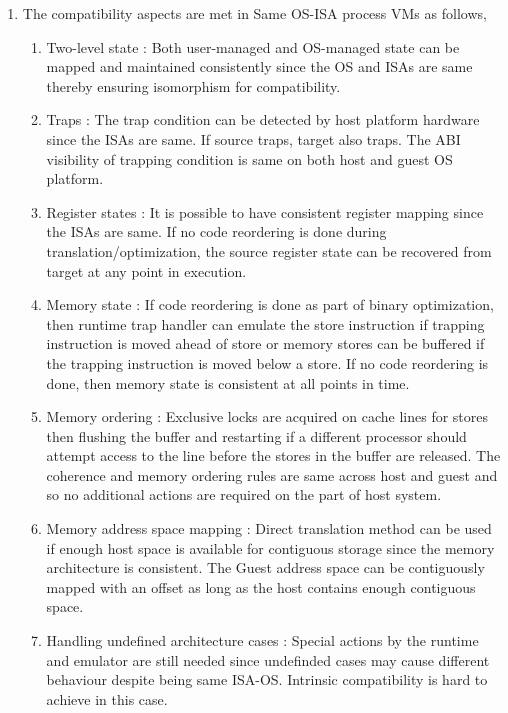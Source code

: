 \documentclass[11pt,a4paper,oneside]{article}
\begin{document}
\begin{enumerate}
		\item The compatibility aspects are met in Same OS-ISA process VMs as follows,
			\begin{enumerate}
				\item Two-level state : Both user-managed and OS-managed state can be mapped and maintained consistently since the OS and ISAs are same thereby ensuring isomorphism for compatibility.
				\item Traps : The trap condition can be detected by host platform hardware since the ISAs are same. If source traps, target also traps. The ABI visibility of trapping condition is same on both host and guest OS platform. 
				\item Register states : It is possible to have consistent register mapping since the ISAs are same. If no code reordering is done during translation/optimization, the source register state can be recovered from target at any point in execution.
				\item Memory state : If code reordering is done as part of binary optimization, then runtime trap handler can emulate the store instruction if trapping instruction is moved ahead of  store or memory stores can be buffered if the trapping instruction is moved  below a store. If no code reordering is done, then memory state is consistent at all points in time.
				\item Memory ordering : Exclusive locks are acquired on cache lines for stores 
			 then flushing the buffer and restarting if a different processor
				should attempt access to the line before the stores in the buffer are released. The coherence and memory ordering rules are same across host and guest and so no additional actions are required on the part of host system.
				\item Memory address space mapping : Direct translation method can be used if enough host space is available for contiguous storage since the memory architecture is consistent. The Guest address space can be contiguously mapped with an offset as long as the host contains enough contiguous space.
				\item Handling undefined architecture cases : Special actions by the runtime and emulator are still needed since undefinded cases may cause different behaviour despite being same ISA-OS. Intrinsic compatibility is hard to achieve in this case.
			\end{enumerate}
		

\end{enumerate}
\end{document}
